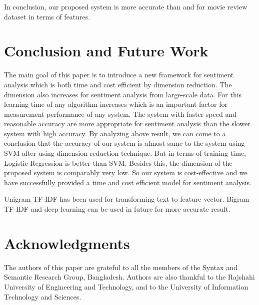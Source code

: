 \documentclass[10pt, conference]{IEEEtran}
\begin{document}
	In conclusion, our proposed system is more accurate than \cite{b11} and \cite{b14} for movie review dataset in terms of features.
	
	\section{Conclusion and Future Work} The main goal of this paper is to introduce a new framework for sentiment analysis which is both time and cost efficient by dimension reduction. The dimension also increases for sentiment analysis from large-scale data. For this learning time of any algorithm increases which is an important factor for measurement performance of any system. The system with faster speed and reasonable accuracy are more appropriate for sentiment analysis than the slower system with high accuracy. By analyzing above result, we can come to a conclusion that the accuracy of our system is almost same to the system using SVM after using dimension reduction technique. But in terms of training time, Logistic Regression is better than SVM. Besides this, the dimension of the proposed system is comparably very low. So our system is cost-effective and we have successfully provided a time and cost efficient model for sentiment analysis.
	
	Unigram TF-IDF has been used for transforming text to feature vector. Bigram TF-IDF and deep learning can be used in future for more accurate result.
	
	\section*{Acknowledgments}The authors of this paper are grateful to all the members of the Syntax and Semantic Research Group, Bangladesh. Authors are also thankful to the Rajshahi University of Engineering and Technology, and to the University of Information Technology and Sciences.
	
\end{document}
